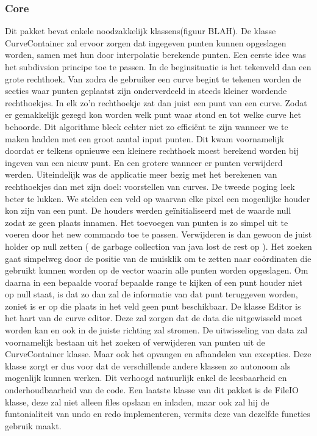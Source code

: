 \documentclass[a4paper,11pt,oneside, titlepage]{article}
\begin{document}
\subsubsection{Core}
Dit pakket bevat enkele noodzakkelijk klassens(figuur BLAH).\newline \newline
De klasse CurveContainer zal ervoor zorgen dat ingegeven punten kunnen opgeslagen worden, samen
met hun door interpolatie berekende punten. \newline \newline
Een eerste idee was het subdivsion principe toe te passen. In de beginsituatie is het tekenveld
dan een grote rechthoek. Van zodra de gebruiker een curve begint te tekenen worden de secties
waar punten geplaatst zijn onderverdeeld in steeds kleiner wordende rechthoekjes. In elk zo'n
rechthoekje zat dan juist een punt van een curve. Zodat er gemakkelijk gezegd kon worden
welk punt waar stond en tot welke curve het behoorde.\newline
Dit algorithme bleek echter niet zo effici\"ent te zijn wanneer we te maken hadden met een groot
aantal input punten. Dit kwam voornamelijk doordat er telkens opnieuwe een kleinere rechthoek
moest berekend worden bij ingeven van een nieuw punt. En een grotere wanneer er punten verwijderd
werden. Uiteindelijk was de applicatie meer bezig met het berekenen van rechthoekjes dan met zijn
doel: voorstellen van curves.\newline \newline
De tweede poging leek beter te lukken. We stelden een veld op waarvan elke pixel een mogenlijke
houder kon zijn van een punt. De houders werden ge\"initialiseerd met de waarde null zodat ze 
geen
plaats innamen. Het toevoegen van punten is zo simpel uit te voeren door het new commando toe
te passen. Verwijderen is dan gewoon de juist holder op null zetten ( de garbage collection van
java lost de rest op ). Het zoeken gaat simpelweg door de positie van de muisklik om te 
zetten naar co\"ordinaten die gebruikt kunnen worden op de vector waarin alle punten worden 
opgeslagen. Om daarna in een bepaalde vooraf bepaalde range te kijken of een punt houder niet
op null staat, is dat zo dan zal de informatie van dat punt teruggeven worden, zoniet is er op
die plaats in het veld geen punt beschikbaar.\newline \newline
De klasse Editor is het hart van de curve editor. Deze zal zorgen dat de data die uitgewisseld
moet worden kan en ook in de juiste richting zal stromen. De uitwisseling van data zal 
voornamelijk bestaan uit het zoeken of verwijderen van punten uit de CurveContainer klasse.
Maar ook het opvangen en afhandelen van excepties. Deze klasse zorgt er dus voor dat de 
verschillende andere klassen zo autonoom als mogenlijk kunnen werken. Dit verhoogd natuurlijk
enkel de leesbaarheid en onderhoudbaarheid van de code.\newline \newline
Een laatste klasse van dit pakket is de FileIO klasse, deze zal niet alleen files opslaan en
inladen, maar ook zal hij de funtonialiteit van undo en redo implementeren, vermits deze van
dezelfde functies gebruik maakt.
\end{document}
